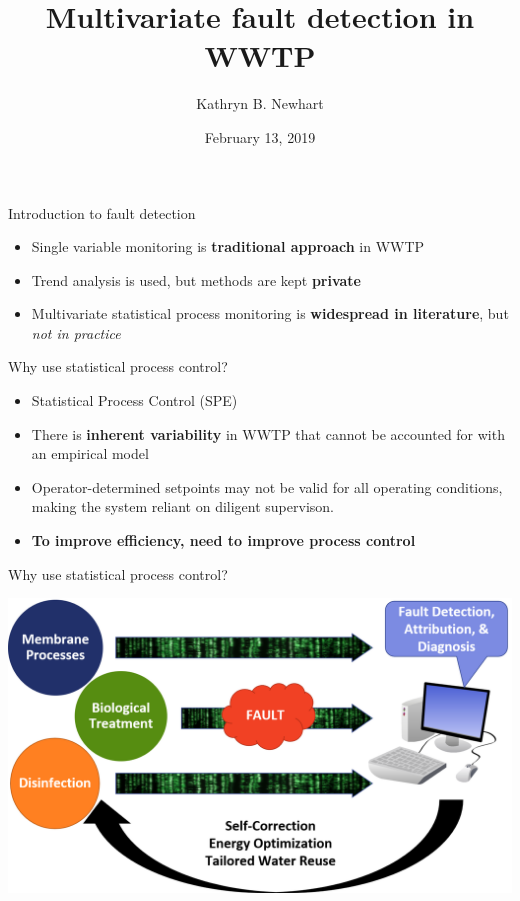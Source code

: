 \documentclass{beamer}
\title{Multivariate fault detection in WWTP}
\author{Kathryn B. Newhart}
\date{February 13, 2019}
\institute{Colorado School of Mines}
\providecommand{\tightlist}{%
  \setlength{\itemsep}{0pt}\setlength{\parskip}{0pt}}
\begin{document}
\frame{\titlepage}

\begin{frame}{Introduction to fault detection}
\protect\hypertarget{introduction-to-fault-detection}{}

\begin{itemize}
\tightlist
\item
  Single variable monitoring is \textbf{traditional approach} in WWTP
\item
  Trend analysis is used, but methods are kept \textbf{private}
\item
  Multivariate statistical process monitoring is \textbf{widespread in
  literature}, but \emph{not in practice}
\end{itemize}

\end{frame}

\begin{frame}{Why use statistical process control?}
\protect\hypertarget{why-use-statistical-process-control}{}

\begin{itemize}
\tightlist
\item
  Statistical Process Control (SPE)
\item
  There is \textbf{inherent variability} in WWTP that cannot be
  accounted for with an empirical model
\item
  Operator-determined setpoints may not be valid for all operating
  conditions, making the system reliant on diligent supervison.
\item
  \textbf{To improve efficiency, need to improve process control}
\end{itemize}

\end{frame}

\begin{frame}{Why use statistical process control?}
\protect\hypertarget{why-use-statistical-process-control-1}{}

\includegraphics{images/wwtp_data_fault_diagram.png}

\end{frame}
\end{document}
